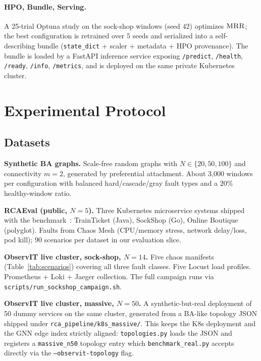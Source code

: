 \documentclass[11pt,a4paper]{article}
\newcommand{\MRR}{\textsc{MRR}}
\begin{document}
\paragraph{HPO, Bundle, Serving.}
A 25-trial Optuna study on the sock-shop windows (seed $42$) optimizes
$\MRR{}$; the best configuration is retrained over $5$ seeds and serialized
into a self-describing bundle (\texttt{state\_dict} + scaler + metadata
+ HPO provenance). The bundle is loaded by a FastAPI inference service
exposing \texttt{/predict}, \texttt{/health}, \texttt{/ready},
\texttt{/info}, \texttt{/metrics}, and is deployed on the same private
Kubernetes cluster.

\section{Experimental Protocol}
\label{sec:proto}

\subsection{Datasets}

\textbf{Synthetic BA graphs.} Scale-free random graphs with
$N \in \{20, 50, 100\}$ and connectivity $m{=}2$, generated by preferential
attachment. About 3{,}000 windows per configuration with balanced
hard/cascade/gray fault types and a $20\%$ healthy-window ratio.

\textbf{RCAEval (public, $N{=}5$).} Three Kubernetes microservice systems
shipped with the benchmark~\cite{pham2024rcaeval}: TrainTicket (Java),
SockShop (Go), Online Boutique (polyglot). Faults from Chaos Mesh
(CPU/memory stress, network delay/loss, pod kill); 90 scenarios per dataset
in our evaluation slice.

\textbf{ObservIT live cluster, sock-shop, $N{=}14$.} Five chaos manifests
(Table~\ref{tab:scenarios}) covering all three fault classes. Five Locust
load profiles. Prometheus + Loki + Jaeger collection. The full campaign
runs via \texttt{scripts/run\_sockshop\_campaign.sh}.

\textbf{ObservIT live cluster, massive, $N{=}50$.} A synthetic-but-real
deployment of 50 dummy services on the same cluster, generated from a
BA-like topology JSON shipped under \texttt{rca\_pipeline/k8s\_massive/}.
This keeps the K8s deployment and the GNN edge index strictly aligned:
\texttt{topologies.py} loads the JSON and registers a \texttt{massive\_n50}
topology entry which \texttt{benchmark\_real.py} accepts directly via the
\texttt{--observit-topology} flag.
\end{document}

